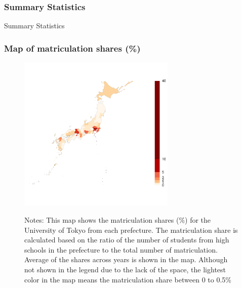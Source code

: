 \documentclass[9pt, pdfmx,hiresbb]{beamer}
\begin{document}
\begin{frame}\frametitle{Summary Statistics}
  \begin{center}
    \begin{table}
      \caption{Summary Statistics}
      \footnotesize
      
    \end{table}
  \end{center}
\end{frame}

\begin{frame}\frametitle{Map of matriculation shares (\%)}
  \begin{center}
    \begin{figure}
      \includegraphics[width=7.5cm]{../Output/images/admission_map.pdf}
      \tiny
      \begin{tablenotes}
      \item Notes:
        This map shows the matriculation shares (\%) for the University of Tokyo from each prefecture.
        The matriculation share is calculated based on the ratio of the number of students from high schools in the prefecture to the total number of matriculation.
        Average of the shares across years is shown in the map.
        Although not shown in the legend due to the lack of the space, the lightest color in the map means the matriculation share between 0 to 0.5\% 
      \end{tablenotes}
    \end{figure}
  \end{center}
\end{frame}
\end{document}
